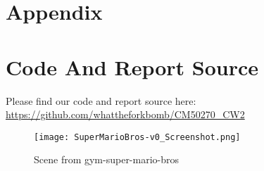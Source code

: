 
\section*{\Large Appendix}
\appendix

\section{Code And Report Source}
Please find our code and report source here: \url{https://github.com/whattheforkbomb/CM50270_CW2}
\begin{figure}[h]
    \centering
    \texttt{[image: SuperMarioBros-v0\_Screenshot.png]}
    \caption{\label{fig:smbv0_screenshot2}Scene from gym-super-mario-bros \citep{kauten2018gymSMB}}
\end{figure}

